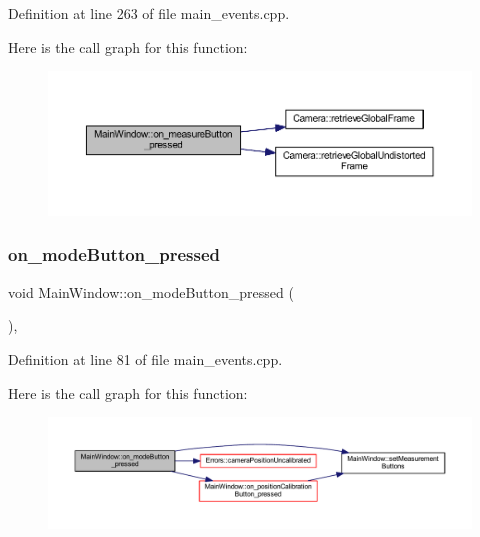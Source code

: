 Definition at line 263 of file main\+\_\+events.\+cpp.

Here is the call graph for this function\+:
\nopagebreak
\begin{figure}[H]
\begin{center}
\leavevmode
\includegraphics[width=350pt]{classMainWindow_aa9bd65042eb23d5fa3f548da285067a6_cgraph}
\end{center}
\end{figure}
\mbox{\label{classMainWindow_a295d30310cac58053dd2218f04a525c8}} 
\subsubsection{\texorpdfstring{on\_modeButton\_pressed}{on\_modeButton\_pressed}}
{\footnotesize\ttfamily void Main\+Window\+::on\+\_\+mode\+Button\+\_\+pressed (\begin{DoxyParamCaption}{ }\end{DoxyParamCaption})\hspace{0.3cm}{\ttfamily [private]}, {\ttfamily [slot]}}



Definition at line 81 of file main\+\_\+events.\+cpp.

Here is the call graph for this function\+:
\nopagebreak
\begin{figure}[H]
\begin{center}
\leavevmode
\includegraphics[width=350pt]{classMainWindow_a295d30310cac58053dd2218f04a525c8_cgraph}
\end{center}
\end{figure}
\mbox{\label{classMainWindow_ad8b394c839532c8b74fb8c7602d3da89}} 
